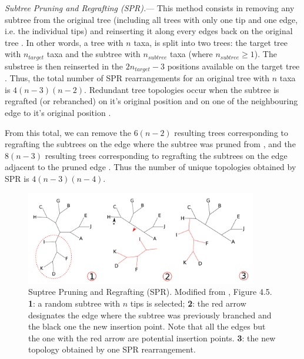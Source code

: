 \documentclass[12pt,letterpaper]{article}
\renewcommand{\subsubsection}[1]{%
\vspace{2ex}
\noindent
\textit{#1.}---}
\begin{document}
\subsubsection{Subtree Pruning and Regrafting (SPR)}
This method consists in removing any subtree from the original tree (including all trees with only one tip and one edge, i.e. the individual tips) and reinserting it along every edges back on the original tree \citep[see Fig \ref{Figure_SPR};][]{felsenstein2004inferring}.
In other words, a tree with $n$ taxa, is split into two trees: the target tree with $n_{target}$ taxa and the subtree with $n_{subtree}$ taxa (where $n_{subtree} \geq 1$).
The substree is then reinserted in the $2n_{target}-3$ positions available on the target tree \citep{felsenstein2004inferring}.
Thus, the total number of SPR rearrangements for an original tree with $n$ taxa is $4(n-3)(n-2)$.
Redundant tree topologies occur when the subtree is regrafted (or rebranched) on it's original position and on one of the neighbouring edge to it's original position \citep{allen2001subtree}.


From this total, we can remove the $6(n-2)$ resulting trees corresponding to regrafting the subtrees on the edge where the subtree was pruned from \citep[i.e. the rearrangements resulting in the same topology; ][]{allen2001subtree}, and the $8(n-3)$ resulting trees corresponding to regrafting the subtrees on the edge adjacent to the pruned edge \citep{allen2001subtree}.
Thus the number of unique topologies obtained by SPR is $4(n-3)(n-4)$.

\begin{figure}[!htbp]
\centering
   \includegraphics[width=0.9\textwidth]{Figure/SPR.pdf}
\caption{Suptree Pruning and Regrafting (SPR). Modified from \cite{felsenstein2004inferring}, Figure 4.5. \textbf{1}: a random subtree with $n$ tips is selected; \textbf{2}: the red arrow designates the edge where the subtree was previously branched and the black one the new insertion point. Note that all the edges but the one with the red arrow are potential insertion points. \textbf{3}: the new topology obtained by one SPR rearrangement.}
\label{Figure_SPR}
\end{figure}
\end{document}
